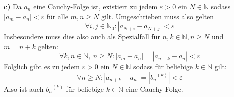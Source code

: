 \documentclass[a4paper,graphics,11pt]{article}
\begin{document}
\textbf{c)}
Da $a_n$ eine Cauchy-Folge ist, existiert zu jedem $\varepsilon > 0$ ein $N\in \mathbb{N}$
sodass $|a_m-a_n| < \varepsilon$ für alle $m,n \geq N$ gilt. Umgeschrieben muss also gelten
$$
    \forall i,j\in \mathbb{N}_0\colon |a_{N+i}-a_{N+j}| < \varepsilon
$$
Insbesondere muss dies also auch als Spezialfall für
$n,k \in \mathbb{N}, n \geq N$ und $m=n+k$ gelten:
$$
    \forall k,n \in \mathbb{N},\ n \geq N\colon |a_m-a_n| = |a_{n+k}-a_n| < \varepsilon
$$
Folglich gibt es zu jedem $\varepsilon > 0$ ein $N \in \mathbb{N}$ sodass für beliebige
$k \in \mathbb{N}$ gilt:
$$
    \forall n \geq N \colon |a_{n+k}-a_n| = |{b_n}^{(k)}|< \varepsilon
$$
Also ist auch ${b_n}^{(k)}$ für beliebige $k \in \mathbb{N}$ eine Cauchy-Folge.
\end{document}
